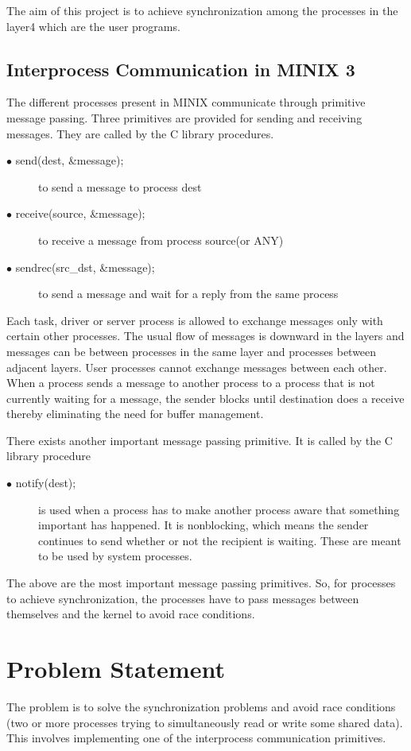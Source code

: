 \documentclass[a4paper,11pt,twocolumn]{article}
\begin{document}
The aim of this project is to achieve synchronization among the processes in the layer4 which are the user programs.

\subsection{Interprocess Communication in MINIX 3}
The different processes present in MINIX communicate through primitive message passing. Three primitives are provided for sending and receiving messages. They are called by the C library procedures.\\
\begin{description}
  \item[$\bullet$ send(dest, \&message);] to send a message to process dest
  \item[$\bullet$ receive(source, \&message);] to receive a message from process source(or ANY)
  \item[$\bullet$ sendrec(src\_dst, \&message);] to send a message and wait for a reply from the same process
\end{description}

Each task, driver or server process is allowed to exchange messages only with certain other processes. The usual flow of messages is downward in the layers and messages can be between processes in the same layer and processes between adjacent layers. User processes cannot exchange messages between each other. When a process sends a message to another process to a process that is not currently waiting for a message, the sender blocks until destination does a receive thereby eliminating the need for buffer management.

There exists another important message passing primitive. It is called by the C library procedure\\

\begin{description}
  \item[$\bullet$ notify(dest);] is used when a process has to make another process aware that something important has happened. It is nonblocking, which means the sender continues to send whether or not the recipient is waiting. These are meant to be used by system processes.
\end{description}
The above are the most important message passing primitives. So, for processes to achieve synchronization, the processes have to pass messages between themselves and the kernel to avoid race conditions.

\section{Problem Statement}
The problem is to solve the synchronization problems and avoid race conditions (two or more processes trying to simultaneously read or write some shared data). This involves implementing one of the interprocess communication primitives.
\end{document}
